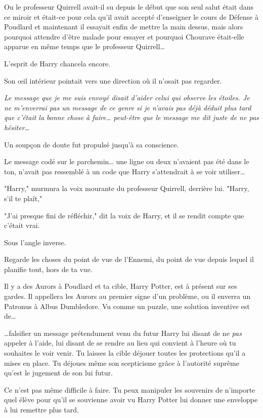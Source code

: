Ou le professeur Quirrell avait-il su depuis le début que son seul salut était dans ce miroir et était-ce pour cela qu'il avait accepté d'enseigner le cours de Défense à Poudlard et maintenant il essayait enfin de mettre la main dessus, mais alors pourquoi attendre d'être malade pour essayer et pourquoi Chourave était-elle apparue en même temps que le professeur Quirrell…

L'esprit de Harry chancela encore.

Son œil intérieur pointait vers une direction où il n'osait pas regarder.

\emph{Le message que je me suis envoyé disait d'aider celui qui observe les étoiles. Je ne m'enverrai pas un message de ce genre si je n'avais pas déjà déduit plus tard que c'était la bonne chose à faire… peut-être que le message me dit juste de ne pas hésiter…} 

Un soupçon de doute fut propulsé jusqu'à sa conscience.

Le message codé sur le parchemin… une ligne ou deux n'avaient pas été dans le ton, n'avait pas ressemblé à un code que Harry s'attendrait à se voir utiliser…

"Harry," murmura la voix mourante du professeur Quirrell, derrière lui. "Harry, s'il te plaît,"

"J'ai presque fini de réfléchir," dit la voix de Harry, et il se rendit compte que c'était vrai.

Sous l'angle inverse.

Regarde les choses du point de vue de l'Ennemi, du point de vue depuis lequel il planifie tout, hors de ta vue.

Il y a des Aurors à Poudlard et ta cible, Harry Potter, est à présent sur ses gardes. Il appellera les Aurors au premier signe d'un problème, ou il enverra un Patronus à Albus Dumbledore. Vu comme un puzzle, une solution inventive est de…

…falsifier un message prétendument venu du futur Harry lui disant de ne \emph{pas}  appeler à l'aide, lui disant de se rendre au lieu qui convient à l'heure où tu souhaites le voir venir. Tu laisses la cible déjouer toutes les protections qu'il a mises en place. Tu déjoues même son scepticisme grâce à l'autorité suprême qu'est le jugement de son lui futur.

Ce n'est pas même difficile à faire. Tu peux manipuler les souvenirs de n'importe quel élève pour qu'il se souvienne avoir vu Harry Potter lui donner une enveloppe à lui remettre plus tard.


